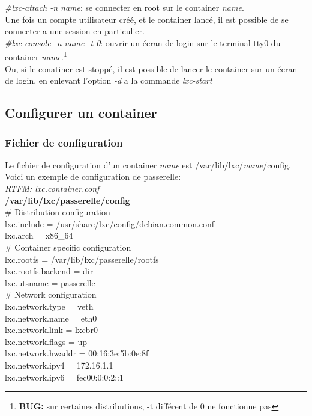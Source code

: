 \documentclass{article}
\begin{document}
\emph{\#lxc-attach -n name}: se connecter en root sur le container \emph{name}.\\
Une fois un compte utilisateur cr\'e\'e, et le container lanc\'e, il est possible de se connecter a une session en particulier.\\

\emph{\#lxc-console -n name -t 0}: ouvrir un \'ecran de login sur le terminal tty0 du container \emph{name}.\footnote{\textbf{BUG:} sur certaines distributions, -t diff\'erent de 0 ne fonctionne pas}\\
Ou, si le conatiner est stopp\'e, il est possible de lancer le container sur un \'ecran de login, en enlevant l'option \emph{-d} a la commande \emph{lxc-start}

\subsection{Configurer un container}
\subsubsection{Fichier de configuration}
Le fichier de configuration d'un container \emph{name} est /var/lib/lxc/\emph{name}/config. Voici un exemple de configuration de passerelle:\\
\emph{RTFM: lxc.container.conf}\\

\noindent
\textbf{/var/lib/lxc/passerelle/config}\\

\noindent
\# Distribution configuration\\
lxc.include = /usr/share/lxc/config/debian.common.conf\\
lxc.arch = x86\_64\\

\noindent
\# Container specific configuration\\
lxc.rootfs = /var/lib/lxc/passerelle/rootfs\\
lxc.rootfs.backend = dir\\
lxc.utsname = passerelle\\

\noindent
\# Network configuration\\
lxc.network.type = veth\\
lxc.network.name = eth0\\
lxc.network.link = lxcbr0\\
lxc.network.flags = up\\
lxc.network.hwaddr = 00:16:3e:5b:0e:8f\\
lxc.network.ipv4 = 172.16.1.1\\
lxc.network.ipv6 = fec00:0:0:2::1\\
\end{document}
